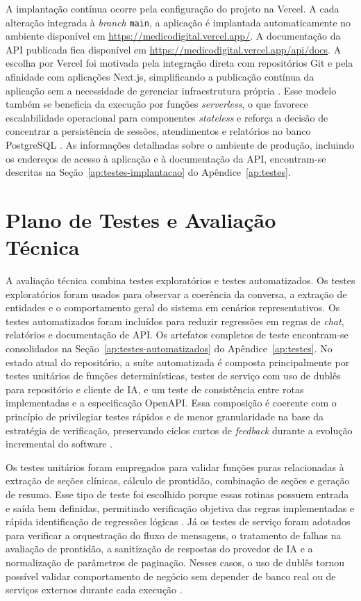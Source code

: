 A implantação contínua ocorre pela configuração do projeto na Vercel. A cada alteração
integrada à \textit{branch} \texttt{main}, a aplicação é implantada automaticamente no ambiente
disponível em \url{https://medicodigital.vercel.app/}. A documentação da API publicada fica
disponível em \url{https://medicodigital.vercel.app/api/docs}. A escolha por Vercel foi
motivada pela integração direta com repositórios Git e pela afinidade com aplicações Next.js,
simplificando a publicação contínua da aplicação sem a necessidade de gerenciar infraestrutura
própria \cite{vercelgit2026}. Esse modelo também se beneficia da execução por funções
\textit{serverless}, o que favorece escalabilidade operacional para componentes \textit{stateless}
e reforça a decisão de concentrar a persistência de sessões, atendimentos e relatórios no banco
PostgreSQL \cite{redhatstateless2025,vercelfunctions2026}. As informações detalhadas sobre o ambiente 
de produção, incluindo os endereços de acesso à aplicação e à documentação da API, encontram-se 
descritas na Seção~\ref{ap:testes-implantacao} do Apêndice~\ref{ap:testes}.

\section{Plano de Testes e Avaliação Técnica}

A avaliação técnica combina testes exploratórios e testes automatizados. Os testes
exploratórios foram usados para observar a coerência da conversa, a extração de entidades e o
comportamento geral do sistema em cenários representativos. Os testes automatizados foram
incluídos para reduzir regressões em regras de \textit{chat}, relatórios e documentação de API. Os
artefatos completos de teste encontram-se consolidados na Seção~\ref{ap:testes-automatizados} do 
Apêndice~\ref{ap:testes}. No estado atual do repositório, a suíte automatizada é composta principalmente 
por testes unitários de funções determinísticas, testes de serviço com uso de dublês para repositório e
cliente de IA, e um teste de consistência entre rotas implementadas e a especificação OpenAPI.
Essa composição é coerente com o princípio de privilegiar testes rápidos e de menor granularidade
na base da estratégia de verificação, preservando ciclos curtos de \textit{feedback} durante a evolução
incremental do software \cite{microsofttesting2026,nodejsTestRunner2026,fowler2018}.

Os testes unitários foram empregados para validar funções puras relacionadas à extração de
seções clínicas, cálculo de prontidão, combinação de seções e geração de resumo. Esse tipo de
teste foi escolhido porque essas rotinas possuem entrada e saída bem definidas, permitindo
verificação objetiva das regras implementadas e rápida identificação de regressões lógicas
\cite{microsofttesting2026}. Já os testes de serviço foram adotados para verificar a orquestração
do fluxo de mensagens, o tratamento de falhas na avaliação de prontidão, a sanitização de
respostas do provedor de IA e a normalização de parâmetros de paginação. Nesses casos, o uso
de dublês tornou possível validar comportamento de negócio sem depender de banco real ou de
serviços externos durante cada execução \cite{microsofttesting2026,fowler2018}.

